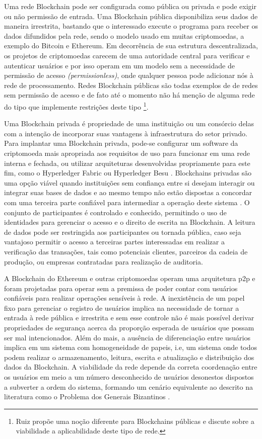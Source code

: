 \documentclass[a4paper,11pt]{article}
\begin{document}
Uma rede Blockchain pode ser configurada como pública ou privada e
pode exigir ou não permissão de entrada.%
Uma Blockchain pública disponibiliza seus dados de maneira irrestrita, bastando que o interessado execute o programa para receber os dados difundidos pela rede, sendo o modelo usado em muitas criptomoedas, a exemplo do Bitcoin e Ethereum.
Em decorrência de sua estrutura descentralizada, os projetos de criptomoedas carecem de uma autoridade central para verificar e autenticar usuários e por isso operam em um modelo sem a necessidade de permissão de acesso \emph{(permissionless)}, onde qualquer pessoa pode adicionar nós à rede de processamento.
Redes Blockchain públicas são todas exemplos de de redes sem permissão de acesso e de fato até o momento não há menção de alguma rede do tipo que implemente restrições deste tipo
\footnote{Ruiz\cite{Ruiz2020} propõe uma noção diferente para Blockchains públicas e discute sobre a viabilidade a aplicabilidade deste tipo de rede.}.

Uma Blockchain privada é propriedade de uma instituição ou um consórcio delas com a intenção de incorporar suas vantagens à infraestrutura do setor privado.
Para implantar uma Blockchain privada, pode-se configurar um software da criptomoeda mais apropriada aos requisitos de uso para funcionar em uma rede interna e fechada, ou utilizar arquiteturas desenvolvidas propriamente para este fim, como o Hyperledger Fabric ou Hyperledger Besu \cite{Blummer2019}.
Blockchains privadas são uma opção viável quando instituições sem confiança entre si desejam interagir ou integrar suas bases de dados e ao mesmo tempo não estão dispostas a concordar com uma terceira parte confiável para intermediar a operação deste sistema \cite{OLeary2017, Wust2017}.
O conjunto de participantes é controlado e conhecido, permitindo o uso de identidades para gerenciar o acesso e o direito de escrita na Blockchain.
A leitura de dados pode ser restringida aos participantes ou tornada pública, caso seja vantajoso permitir o acesso a terceiras partes interessadas em realizar a verificação das transações, tais como potenciais clientes, parceiros da cadeia de produção, ou empresas contratadas para realização de auditoria.

A Blockchain do Ethereum e outras criptomoedas operam uma arquitetura p2p e foram projetadas para operar sem a premissa de poder contar com usuários confiáveis para realizar operações sensíveis à rede.
A inexistência de um papel fixo para gerenciar o registro de usuários implica na necessidade de tornar a entrada à rede pública e irrestrita e sem esse controle não é mais possível derivar propriedades de segurança acerca da proporção esperada de usuários que possam ser mal intencionados.
Além do mais, a ausência de diferenciação entre usuários implica em um sistema com homogeneidade de papeis, i.e, um sistema onde todos podem realizar o armazenamento, leitura, escrita e atualização e distribuição dos dados da Blockchain.
A viabilidade da rede depende da correta coordenação entre os usuários em meio a um número desconhecido de usuários desonestos dispostos a subverter a ordem do sistema, formando um cenário equivalente ao descrito na literatura como o Problema dos Generais Bizantinos \cite{Lamport1982}.
\end{document}
